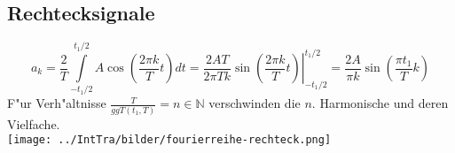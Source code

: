 	\subsection{Rechtecksignale}
	$$a_k=\frac{2}{T}\int\limits_{-t_1/2}^{t_1/2}A\cos\left(\frac{2\pi k}{T}t\right)dt=
	\left .\frac{2AT}{2\pi T k}\sin \left(\frac{2\pi k}{T}t\right)\right |_{-t_1/2}^{t_1/2}=
	\frac{2A}{\pi k}\sin\left(\frac{\pi t_1}{T}k\right)$$
	F"ur Verh"altnisse $\frac{T}{ggT(t_1,T)}=n\in\mathbb{N}$ verschwinden die
	$n.$ Harmonische und deren Vielfache.\\
	\texttt{[image: ../IntTra/bilder/fourierreihe-rechteck.png]}